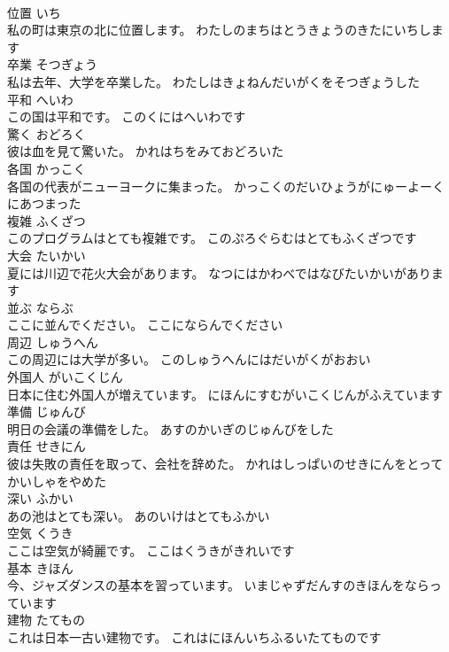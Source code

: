 \documentclass[8pt]{extreport}
\begin{document}
\begin{CJK}{UTF8}{min}
\\	位置	いち	
\\	私の町は東京の北に位置します。	わたしのまちはとうきょうのきたにいちします	
\\	卒業	そつぎょう	
\\	私は去年、大学を卒業した。	わたしはきょねんだいがくをそつぎょうした	
\\	平和	へいわ	
\\	この国は平和です。	このくにはへいわです	
\\	驚く	おどろく	
\\	彼は血を見て驚いた。	かれはちをみておどろいた	
\\	各国	かっこく	
\\	各国の代表がニューヨークに集まった。	かっこくのだいひょうがにゅーよーくにあつまった	
\\	複雑	ふくざつ	
\\	このプログラムはとても複雑です。	このぷろぐらむはとてもふくざつです	
\\	大会	たいかい	
\\	夏には川辺で花火大会があります。	なつにはかわべではなびたいかいがあります	
\\	並ぶ	ならぶ	
\\	ここに並んでください。	ここにならんでください	
\\	周辺	しゅうへん	
\\	この周辺には大学が多い。	このしゅうへんにはだいがくがおおい	
\\	外国人	がいこくじん	
\\	日本に住む外国人が増えています。	にほんにすむがいこくじんがふえています	
\\	準備	じゅんび	
\\	明日の会議の準備をした。	あすのかいぎのじゅんびをした	
\\	責任	せきにん	
\\	彼は失敗の責任を取って、会社を辞めた。	かれはしっぱいのせきにんをとってかいしゃをやめた	
\\	深い	ふかい	
\\	あの池はとても深い。	あのいけはとてもふかい	
\\	空気	くうき	
\\	ここは空気が綺麗です。	ここはくうきがきれいです	
\\	基本	きほん	
\\	今、ジャズダンスの基本を習っています。	いまじゃずだんすのきほんをならっています	
\\	建物	たてもの	
\\	これは日本一古い建物です。	これはにほんいちふるいたてものです	

\end{CJK}
\end{document}
